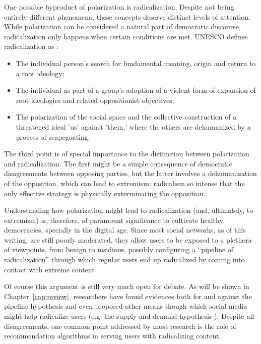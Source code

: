 One possible byproduct of polarization is radicalization. Despite not being
entirely different phenomena, these concepts deserve distinct levels of
attention. While polarization can be considered a natural part of democratic
discourse, radicalization only happens when certain conditions are met. UNESCO
defines radicalization as \citep{seraphin_youth_2017}:

\begin{itemize}
  \item The individual person's search for fundamental meaning, origin and
        return to a root ideology;
  \item The individual as part of a group's adoption of a violent form of
        expansion of root ideologies and related oppositionist objectives;
  \item The polarization of the social space and the collective construction of
        a threatened ideal 'us' against 'them,' where the others are dehumanized
        by a process of scapegoating.
\end{itemize}

The third point is of special importance to the distinction between polarization
and radicalization. The first might be a simple consequence of democratic
disagreements between opposing parties, but the latter involves a dehumanization
of the opposition, which can lead to extremism: radicalism so intense that the
only effective strategy is physically exterminating the opposition.

Understanding how polarization might lead to radicalization (and, ultimately, to
extremism) is, therefore, of paramount significance to cultivate healthy
democracies, specially in the digital age. Since most social networks, as of
this writing, are still poorly moderated, they allow users to be exposed to a
plethora of viewpoints, from benign to insidious, possibly configuring a
``pipeline of radicalization'' through which regular users end up radicalized by
coming into contact with extreme content \citep{ribeiro_auditing_2020}.

Of course this argument is still very much open for debate. As will be shown in
Chapter~\ref{cap:review}, researchers have found evidences both for and against
the pipeline hypothesis and even proposed other means though which social media
might help radicalize users (e.g. the supply and demand hypothesis
\citep{munger_right-wing_2020}). Despite all disagreements, one common point
addressed by most research is the role of recommendation algorithms in serving
users with radicalizing content.

